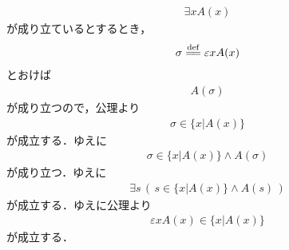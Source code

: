 	\begin{sketch}
		\begin{align}
			\exists x A(x)
		\end{align}
		が成り立ているとするとき，
		\begin{align}
			\sigma \defeq \varepsilon x A(x)
		\end{align}
		とおけば
		\begin{align}
			A(\sigma)
		\end{align}
		が成り立つので，公理より
		\begin{align}
			\sigma \in \{x|A(x)\}
		\end{align}
		が成立する．ゆえに
		\begin{align}
			\sigma \in \{x|A(x)\} \wedge A(\sigma)
		\end{align}
		が成り立つ．ゆえに
		\begin{align}
			\exists s\, \left(\, s \in \{x|A(x)\} \wedge A(s)\, \right)
		\end{align}
		が成立する．ゆえに公理より
		\begin{align}
			\varepsilon x A(x) \in \{x|A(x)\}
		\end{align}
		が成立する．
		\QED
	\end{sketch}
	
